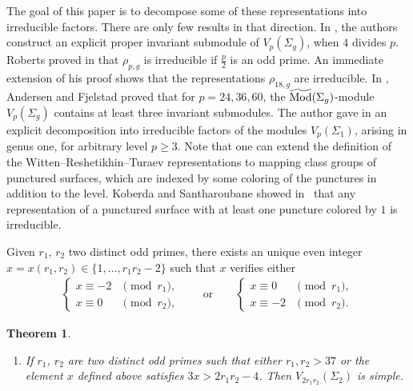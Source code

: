 \documentclass[11pt]{article}
\numberwithin{equation}{section}
\newtheorem{Theorem}{Theorem}[section]
\begin{document}
The goal of this paper is to decompose some of these representations into irreducible factors. There are only few results in that direction. In \cite{BHMV2}, the authors construct an explicit proper invariant submodule of $V_p(\Sigma_g)$, when $4$ divides $p$. Roberts proved in \cite{Ro} that $\rho_{p,g}$ is irreducible if $\frac{p}{2}$ is an odd prime. An immediate extension of his proof shows that the representations $\rho_{18,g}$ are irreducible. In \cite{AF}, Andersen and Fjelstad proved that for $p=24,36,60$, the $\widetilde{\operatorname{Mod}}(\Sigma_g)$-module $V_p(\Sigma_g)$ contains at least three invariant submodules. The author gave in \cite{Koju1} an explicit decomposition into irreducible factors of the modules $V_p(\Sigma_1)$, arising in genus one, for arbitrary level $p\geq 3$. Note that one can extend the definition of the Witten--Reshetikhin--Turaev representations to mapping class groups of punctured surfaces, which are indexed by some coloring of the punctures in addition to the level. Koberda and Santharoubane showed in~\cite{KoberdaSantharoubane17} that any representation of a punctured surface with at least one puncture colored by $1$ is irreducible.

Given $r_1$, $r_2$ two distinct odd primes, there exists an unique even integer $x=x(r_1,r_2)\in \{ 1, \ldots, r_1r_2-2\}$ such that $x$ verifies either
\begin{gather*} \begin{cases}
x\equiv -2 &\pmod{r_1}, \\
x\equiv 0 & \pmod{r_2},
\end{cases} \qquad \text{or}\qquad \begin{cases}
x\equiv 0 &\pmod{r_1}, \\
x\equiv -2 & \pmod{r_2}.
\end{cases}\end{gather*}

\setcounter{section}{1}
\setcounter{subsection}{0}
\setcounter{subsubsection}{0}
\setcounter{Theorem}{0}
\setcounter{equation}{0}
\begin{Theorem}\label{main_th}\quad
\begin{enumerate}\itemsep=0pt

\setcounter{section}{1}
\setcounter{subsection}{0}
\setcounter{subsubsection}{0}
\setcounter{Theorem}{1}
\setcounter{equation}{0}
\item[$4.$] If $r_1$, $r_2$ are two distinct odd primes such that either $r_1,r_2>37$ or the element $x$ defined above satisfies $3x>2r_1r_2-4$. Then $V_{2r_1r_2}(\Sigma_2)$ is simple.
\end{enumerate}
\end{Theorem}
\end{document}
